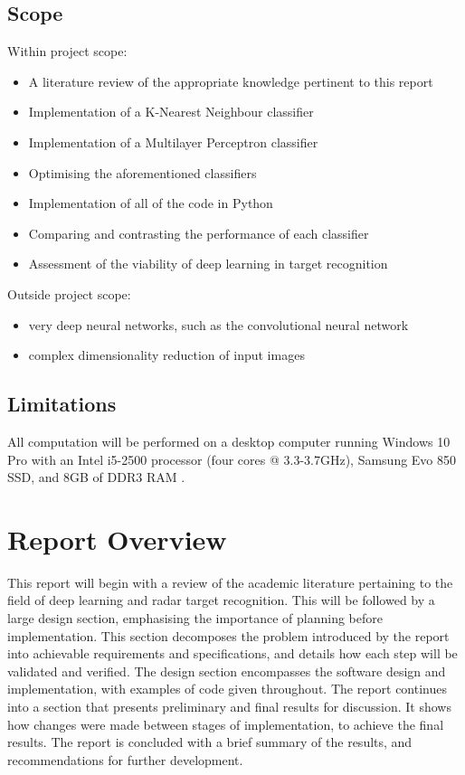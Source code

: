 \subsection{Scope}
Within project scope:
\begin{itemize}
	\item A literature review of the appropriate knowledge pertinent to this report
	\item Implementation of a K-Nearest Neighbour classifier
	\item Implementation of a Multilayer Perceptron classifier	
	\item Optimising the aforementioned classifiers
	\item Implementation of all of the code in Python 
	\item Comparing and contrasting the performance of each classifier
	\item Assessment of the viability of deep learning in target recognition
	
\end{itemize}
Outside project scope:
\begin{itemize}
	\item very deep neural networks, such as the convolutional neural network
	\item complex dimensionality reduction of input images
\end{itemize}
\subsection{Limitations}
All computation will be performed on a desktop computer running Windows 10 Pro with an Intel i5-2500 processor (four cores @ 3.3-3.7GHz), Samsung Evo 850 SSD, and 8GB of DDR3 RAM .




\section{Report Overview}

This report will begin with a review of the academic literature pertaining to the field of deep learning and radar target recognition. This will be followed by a large design section, emphasising the importance of planning before implementation. This section decomposes the problem introduced by the report into achievable requirements and specifications, and details how each step will be validated and verified. The design section encompasses the software design and implementation, with examples of code given throughout. The report continues into a section that presents preliminary and final results for discussion. It shows how changes were made between stages of implementation, to achieve the final results. The report is concluded with a brief summary of the results, and recommendations for further development.

